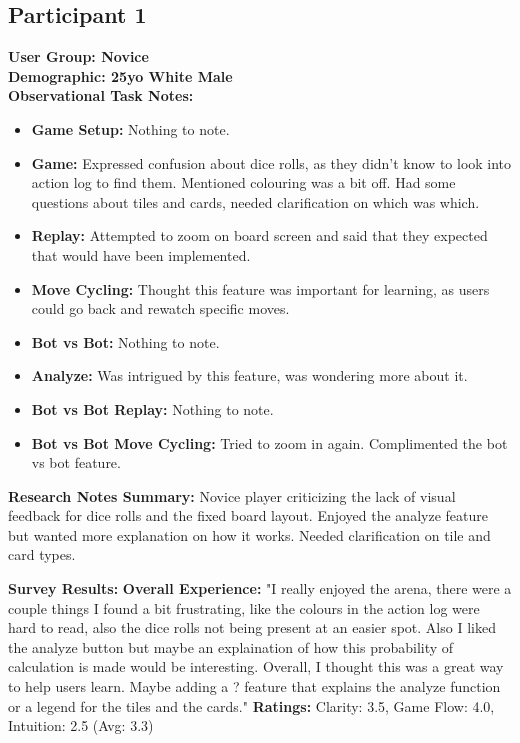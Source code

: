 \documentclass[12pt]{article}
\begin{document}
\subsection{Participant 1}
\textbf {User Group: Novice} \\
\textbf {Demographic: 25yo White Male} \\
\textbf{Observational Task Notes:}
\begin{itemize}
    \item \textbf{Game Setup:} Nothing to note.
    \item \textbf{Game:} Expressed confusion about dice rolls, as they didn't know to look into action log to find them. Mentioned colouring was a bit off. Had some questions about tiles and cards, needed clarification on which was which.
    \item \textbf{Replay:} Attempted to zoom on board screen and said that they expected that would have been implemented.
    \item \textbf{Move Cycling:} Thought this feature was important for learning, as users could go back and rewatch specific moves.
    \item \textbf{Bot vs Bot:} Nothing to note.
    \item \textbf{Analyze:} Was intrigued by this feature, was wondering more about it.
    \item \textbf{Bot vs Bot Replay:} Nothing to note.
    \item \textbf{Bot vs Bot Move Cycling:} Tried to zoom in again. Complimented the bot vs bot feature.
\end{itemize}
\textbf{Research Notes Summary:} Novice player criticizing the lack of visual feedback for dice rolls and the fixed board layout. Enjoyed the analyze feature but wanted more explanation on how it works. Needed clarification on tile and card types. 

\textbf{Survey Results:} 
\subitem \textbf{Overall Experience:} "I really enjoyed the arena, there were a couple things I found a bit frustrating, like the colours in the action log were hard to read, also the dice rolls not being present at an easier spot. Also I liked the analyze button but maybe an explaination of how this probability of calculation is made would be interesting. Overall, I thought this was a great way to help users learn. Maybe adding a ? feature that explains the analyze function or a legend for the tiles and the cards."
\subitem \textbf{Ratings:} Clarity: 3.5, Game Flow: 4.0, Intuition: 2.5 (Avg: 3.3)
\end{document}
